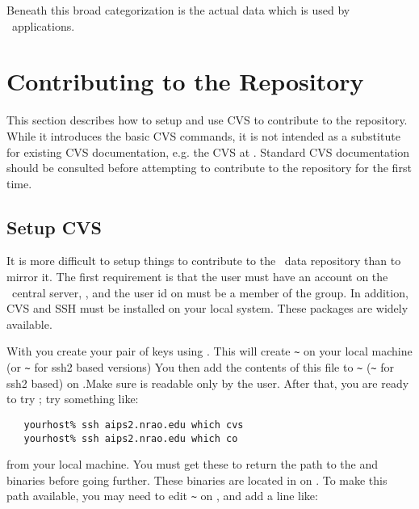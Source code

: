 \noindent
Beneath this broad categorization is the actual data which is used by
\aipspp\ applications.


\section{Contributing to the Repository}
\label{data repository contributing}

This section describes how to setup and use CVS to contribute to the repository.
While it introduces the basic CVS commands, it is not intended as a substitute
for existing CVS documentation, e.g. the CVS
at . Standard CVS documentation should be consulted before
attempting to contribute to the repository for the first time.

\subsection*{Setup CVS}
\label{data repository cvs setup}

It is more difficult to setup things to contribute to the \aipspp\ data
repository than to mirror it. The first requirement is that the user must
have an account on the \aipspp\ central server, , and
the user id on  must be a member of the 
group. In addition, CVS and SSH must be installed on your local system. These
packages are widely available.

With  you create your pair of keys using .
This will create \verb+~+ on your local machine
(or \verb+~+ for ssh2 based versions)
You then add the contents of this file to \verb+~+
(\verb+~+ for ssh2 based)
on .Make sure  is readable only by
the user. After that, you are ready to try ; try something like:

\begin{verbatim}
   yourhost% ssh aips2.nrao.edu which cvs
   yourhost% ssh aips2.nrao.edu which co
\end{verbatim}

\noindent
from your local machine. You must get these to return the path to the
 and  binaries before going further. These binaries
are located in  on . To make
this path available, you may need to edit \verb+~+ on
, and add a line like:

